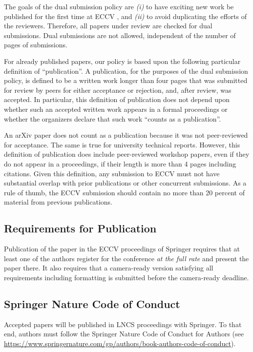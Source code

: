 \documentclass[runningheads]{llncs}
\begin{document}
The goals of the dual submission policy are \emph{(i)} to have exciting new work be published for the first time at ECCV \ECCVyear{}, and \emph{(ii)} to avoid duplicating the efforts of the reviewers.
Therefore, all papers under review are checked for dual submissions.
Dual submissions are not allowed, independent of the number of pages of submissions. 

For already published papers, our policy is based upon the following particular definition of ``publication''. 
A publication, for the purposes of the dual submission policy, is defined to be a written work longer than four pages that was submitted for review by peers for either acceptance or rejection, and, after review, was accepted. 
In particular, this definition of publication does not depend upon whether such an accepted written work appears in a formal proceedings or whether the organizers declare that such work ``counts as a publication''. 

An arXiv paper does not count as a publication because it was not peer-reviewed for acceptance. 
The same is true for university technical reports. 
However, this definition of publication does include peer-reviewed workshop papers, even if they do not appear in a proceedings, if their length is more than 4 pages including citations. 
Given this definition, any submission to ECCV \ECCVyear{} must not have substantial overlap with prior publications or other concurrent submissions. 
As a rule of thumb, the ECCV \ECCVyear{} submission should contain no more than 20 percent of material from previous publications. 


\subsection{Requirements for Publication}
Publication of the paper in the ECCV \ECCVyear{} proceedings of Springer requires that at least one of the authors register for the conference \emph{at the full rate} and present the paper there. 
It also requires that a camera-ready version satisfying all requirements including formatting is submitted before the camera-ready deadline. 

\subsection{Springer Nature Code of Conduct}
Accepted papers will be published in LNCS proceedings with Springer.
To that end, authors must follow the Springer Nature Code of Conduct for Authors (see \url{https://www.springernature.com/gp/authors/book-authors-code-of-conduct}).
\end{document}
